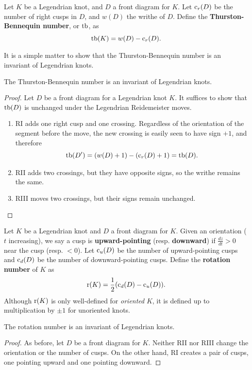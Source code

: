 \begin{definition}
    Let $K$ be a Legendrian knot, and $D$ a front diagram for $K$. Let $\operatorname{c}_r(D)$ be the number of right cusps in $D$, and $w(D)$ the writhe of $D$.
    Define the \textbf{Thurston-Bennequin number}, or $\operatorname{tb}$, as
    \[
        \operatorname{tb}(K) = w(D) - \operatorname{c}_r(D).
    \]
\end{definition}

It is a simple matter to show that the Thurston-Bennequin number is an invariant of Legendrian knots.

\begin{proposition}
    The Thurston-Bennequin number is an invariant of Legendrian knots.
\end{proposition}
\begin{proof}
    Let $D$ be a front diagram for a Legendrian knot $K$. It suffices to show that $\operatorname{tb}(D)$ is unchanged under the Legendrian Reidemeister moves.

    \begin{enumerate}
        \item RI adds one right cusp and one crossing. Regardless of the orientation of the segment before the move, the new crossing is easily seen to have sign $+1$, and therefore
            \[
                \operatorname{tb}(D') = (w(D) + 1) - (\operatorname{c}_r(D) + 1) = \operatorname{tb}(D).
            \]
        \item RII adds two crossings, but they have opposite signs, so the writhe remains the same.
        \item RIII moves two crossings, but their signs remain unchanged.
    \end{enumerate}
    
\end{proof}

\begin{definition}
    Let $K$ be a Legendrian knot and $D$ a front diagram for $K$.
    Given an orientation ($t$ increasing), we say a cusp is \textbf{upward-pointing} (resp. \textbf{downward}) if $\frac{dz}{dt} > 0$ near the cusp (resp. $< 0$).
    Let $\operatorname{c}_u(D)$ be the number of upward-pointing cusps and $\operatorname{c}_d(D)$ be the number of downward-pointing cusps. Define the \textbf{rotation number} of $K$ as 
    \[
        \operatorname{r}(K) = \frac{1}{2} (\operatorname{c}_d(D) - \operatorname{c}_u(D)).
    \]
    Although $\operatorname{r}(K)$ is only well-defined for \emph{oriented} $K$, it is defined up to multiplication by $\pm 1$ for unoriented knots.
\end{definition}
\begin{proposition}
    The rotation number is an invariant of Legendrian knots.
\end{proposition}
\begin{proof}
    As before, let $D$ be a front diagram for $K$. Neither RII nor RIII change the orientation or the number of cusps. On the other hand, RI creates a pair of cusps, one pointing upward and one pointing downward.
\end{proof}

